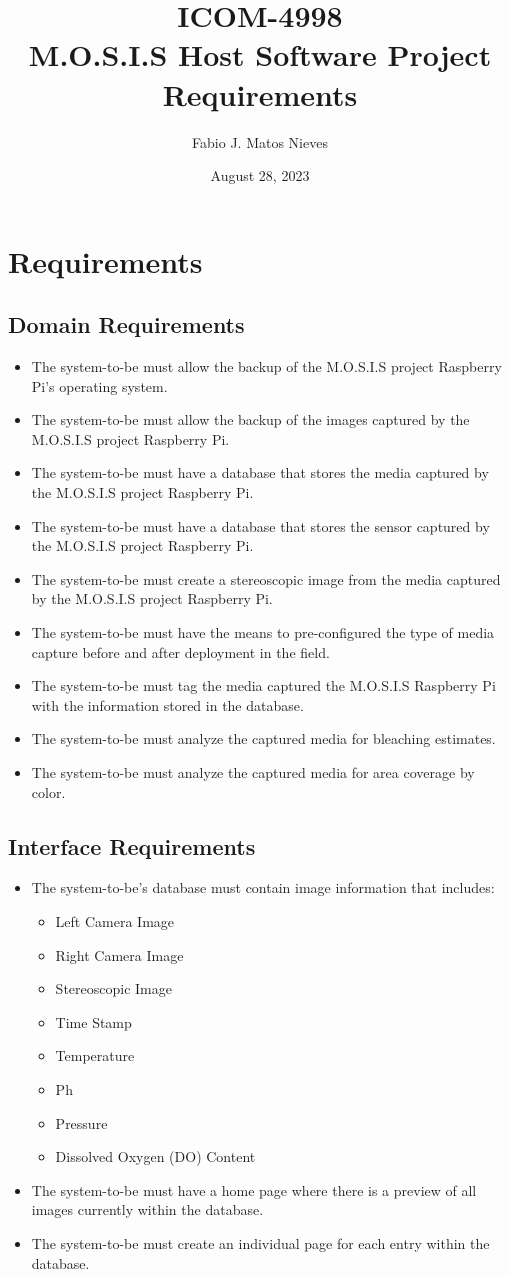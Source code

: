 \documentclass{article}
\title{ICOM-4998\\ M.O.S.I.S Host Software Project Requirements}
\author{Fabio J. Matos Nieves}
\date{August 28, 2023}
\begin{document}
\maketitle
\section{Requirements}
\subsection{Domain Requirements}
\begin{itemize}
	\item The system-to-be must allow the backup of the M.O.S.I.S project Raspberry Pi's operating system.
	\item The system-to-be must allow the backup of the images captured by the M.O.S.I.S project Raspberry Pi.
	\item The system-to-be must have a database that stores the media captured by the M.O.S.I.S project Raspberry Pi.
	\item The system-to-be must have a database that stores the sensor captured by the M.O.S.I.S project Raspberry Pi.
	\item The system-to-be must create a stereoscopic image from the media captured by the M.O.S.I.S project Raspberry Pi.
	\item The system-to-be must have the means to pre-configured the type of media capture before and after deployment in the field.
	\item The system-to-be must tag the media captured the M.O.S.I.S Raspberry Pi with the information stored in the database.
	\item The system-to-be must analyze the captured media for bleaching estimates.
	\item The system-to-be must analyze the captured media for area coverage by color.
\end{itemize}
\subsection{Interface Requirements}
\begin{itemize}
	\item The system-to-be's database must contain image information that includes:
	      \begin{itemize}
		      \item Left Camera Image
		      \item Right Camera Image
		      \item Stereoscopic Image
		      \item Time Stamp
		      \item Temperature
		      \item Ph
		      \item Pressure
		      \item Dissolved Oxygen (DO) Content
	      \end{itemize}
	\item The system-to-be must have a home page where there is a preview of all images currently within the database.
	\item The system-to-be must create an individual page for each entry within the database.
\end{itemize}
\end{document}
